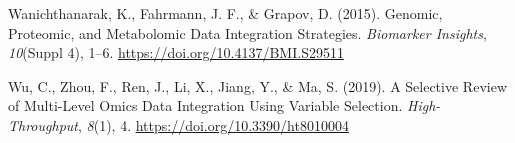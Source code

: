 \documentclass[a4paper, nobind]{templates/ociamthesis}
\newlength{\cslhangindent}
\newenvironment{CSLReferences}[2] %
 {%
  \setlength{\parindent}{0pt}
  \ifodd #1
  \let\oldpar\par
  \def\par{\hangindent=\cslhangindent\oldpar}
  \fi
  \setlength{\parskip}{1mm}
  \setlength{\baselineskip}{6mm}
 }%
 {}
\begin{document}
\begin{CSLReferences}{1}{0}
\leavevmode{}%
Wanichthanarak, K., Fahrmann, J. F., \& Grapov, D. (2015). Genomic, {Proteomic}, and {Metabolomic} {Data} {Integration} {Strategies}. \emph{Biomarker Insights}, \emph{10}(Suppl 4), 1--6. \url{https://doi.org/10.4137/BMI.S29511}

\leavevmode{}%
Wu, C., Zhou, F., Ren, J., Li, X., Jiang, Y., \& Ma, S. (2019). A {Selective} {Review} of {Multi}-{Level} {Omics} {Data} {Integration} {Using} {Variable} {Selection}. \emph{High-Throughput}, \emph{8}(1), 4. \url{https://doi.org/10.3390/ht8010004}

\end{CSLReferences}

\end{document}
